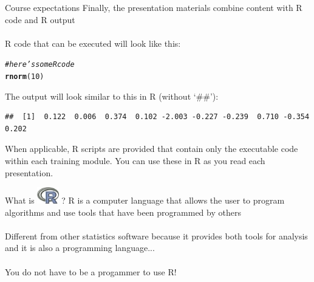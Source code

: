 \documentclass[xcolor=svgnames]{beamer}\usepackage[]{graphicx}\usepackage[]{color}
\makeatletter
\newcommand{\hlnum}[1]{\textcolor[rgb]{0.686,0.059,0.569}{#1}}%
\newcommand{\hlcom}[1]{\textcolor[rgb]{0.678,0.584,0.686}{\textit{#1}}}%
\newcommand{\hlstd}[1]{\textcolor[rgb]{0.345,0.345,0.345}{#1}}%
\newcommand{\hlkwd}[1]{\textcolor[rgb]{0.737,0.353,0.396}{\textbf{#1}}}%
\newenvironment{kframe}{%
 \def\at@end@of@kframe{}%
 \ifinner\ifhmode%
  \def\at@end@of@kframe{\end{minipage}}%
  \begin{minipage}{\columnwidth}%
 \fi\fi%
 \def\FrameCommand##1{\hskip\@totalleftmargin \hskip-\fboxsep
 \colorbox{shadecolor}{##1}\hskip-\fboxsep
     \hskip-\linewidth \hskip-\@totalleftmargin \hskip\columnwidth}%
 \MakeFramed {\advance\hsize-\width
   \@totalleftmargin\z@ \linewidth\hsize
   \@setminipage}}%
 {\par\unskip\endMakeFramed%
 \at@end@of@kframe}
\newenvironment{knitrout}{}{} %
\makeatother
\begin{document}
\begin{frame}[containsverbatim]{Course expectations}
Finally, the presentation materials combine content with R code and R output\\~\\
R code that can be executed will look like this:
\begin{knitrout}
\color{fgcolor}\begin{kframe}
\begin{alltt}
\hlcom{# here's some R code}
\hlkwd{rnorm}\hlstd{(}\hlnum{10}\hlstd{)}
\end{alltt}
\end{kframe}
\end{knitrout}
The output will look similar to this in R (without `\#\#'):
\begin{knitrout}
\color{fgcolor}\begin{kframe}
\begin{verbatim}
##  [1]  0.122  0.006  0.374  0.102 -2.003 -0.227 -0.239  0.710 -0.354  0.202
\end{verbatim}
\end{kframe}
\end{knitrout}
When applicable, R scripts are provided that contain only the executable code within each training module.  You can use these in R as you read each presentation.
\end{frame}

\begin{frame}{What is \includegraphics[width=0.07\textwidth]{Rlogo.jpg} \hspace{0.2em}? }
R is a computer language that allows the user to program algorithms and use tools that have been programmed by others\\~\\
Different from other statistics software because it provides both tools for analysis and it is also a programming language...\\~\\
You do not have to be a progammer to use R!
\end{frame}
\end{document}
